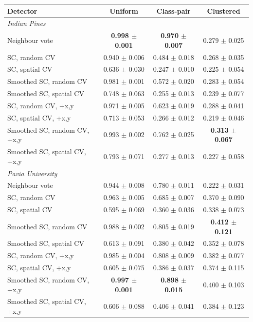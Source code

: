 \begin{tabular}{l ccc}
\toprule
Detector & Uniform & Class-pair & Clustered \\
\midrule
\multicolumn{4}{l}{\textit{Indian Pines}} \\
Neighbour vote & \textbf{0.998 $\pm$ 0.001} & \textbf{0.970 $\pm$ 0.007} & 0.279 $\pm$ 0.025 \\
SC, random CV & 0.940 $\pm$ 0.006 & 0.484 $\pm$ 0.018 & 0.268 $\pm$ 0.035 \\
SC, spatial CV & 0.636 $\pm$ 0.030 & 0.247 $\pm$ 0.010 & 0.225 $\pm$ 0.054 \\
Smoothed SC, random CV & 0.981 $\pm$ 0.001 & 0.572 $\pm$ 0.020 & 0.283 $\pm$ 0.054 \\
Smoothed SC, spatial CV & 0.748 $\pm$ 0.063 & 0.255 $\pm$ 0.013 & 0.239 $\pm$ 0.077 \\
SC, random CV, +x,y & 0.971 $\pm$ 0.005 & 0.623 $\pm$ 0.019 & 0.288 $\pm$ 0.041 \\
SC, spatial CV, +x,y & 0.713 $\pm$ 0.053 & 0.266 $\pm$ 0.012 & 0.219 $\pm$ 0.046 \\
Smoothed SC, random CV, +x,y & 0.993 $\pm$ 0.002 & 0.762 $\pm$ 0.025 & \textbf{0.313 $\pm$ 0.067} \\
Smoothed SC, spatial CV, +x,y & 0.793 $\pm$ 0.071 & 0.277 $\pm$ 0.013 & 0.227 $\pm$ 0.058 \\
\midrule
\multicolumn{4}{l}{\textit{Pavia University}} \\
Neighbour vote & 0.944 $\pm$ 0.008 & 0.780 $\pm$ 0.011 & 0.222 $\pm$ 0.031 \\
SC, random CV & 0.963 $\pm$ 0.005 & 0.685 $\pm$ 0.007 & 0.370 $\pm$ 0.090 \\
SC, spatial CV & 0.595 $\pm$ 0.069 & 0.360 $\pm$ 0.036 & 0.338 $\pm$ 0.073 \\
Smoothed SC, random CV & 0.988 $\pm$ 0.002 & 0.805 $\pm$ 0.019 & \textbf{0.412 $\pm$ 0.121} \\
Smoothed SC, spatial CV & 0.613 $\pm$ 0.091 & 0.380 $\pm$ 0.042 & 0.352 $\pm$ 0.078 \\
SC, random CV, +x,y & 0.985 $\pm$ 0.004 & 0.808 $\pm$ 0.009 & 0.382 $\pm$ 0.077 \\
SC, spatial CV, +x,y & 0.605 $\pm$ 0.075 & 0.386 $\pm$ 0.037 & 0.374 $\pm$ 0.115 \\
Smoothed SC, random CV, +x,y & \textbf{0.997 $\pm$ 0.001} & \textbf{0.898 $\pm$ 0.015} & 0.400 $\pm$ 0.103 \\
Smoothed SC, spatial CV, +x,y & 0.606 $\pm$ 0.088 & 0.406 $\pm$ 0.041 & 0.384 $\pm$ 0.123 \\
\bottomrule
\end{tabular}